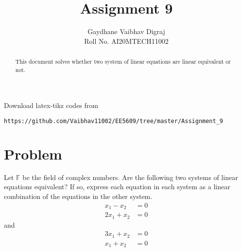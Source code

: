 \documentclass[journal,12pt,twocolumn]{IEEEtran}
\begin{document}
     \def\rightbox#1{\makebox[0in][r]{#1}}
     \def\centbox#1{\makebox[0in]{#1}}
     \def\topbox#1{\raisebox{-\baselineskip}[0in][0in]{#1}}
     \def\midbox#1{\raisebox{-0.5\baselineskip}[0in][0in]{#1}}
\vspace{3cm}
\title{Assignment 9}
\author{Gaydhane Vaibhav Digraj \\ Roll No. AI20MTECH11002}
\maketitle
\newpage
\bigskip
\renewcommand{\thefigure}{\theenumi}
\renewcommand{\thetable}{\theenumi}
\begin{abstract}
This document solves whether two system of linear equations are linear equivalent or not.  
\end{abstract}
%
Download latex-tikz codes from 
%
\begin{lstlisting}
https://github.com/Vaibhav11002/EE5609/tree/master/Assignment_9
\end{lstlisting}
%
\section{Problem}
Let $\mathbb{F}$ be the field of complex numbers. Are the following two systems of linear equations equivalent? If so, express each equation in each system as a linear combination of the equations in the other system.
\begin{align*}
    x_1 - x_2 &=0\\
    2x_1 + x_2 &=0
\end{align*}
and 
\begin{align*}
    3x_1 + x_2 &=0 \\
    x_1 + x_2 &=0
\end{align*}
\end{document}

